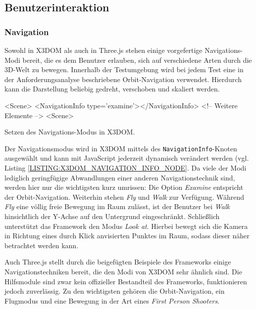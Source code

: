 \subsection{Benutzerinteraktion}

\subsubsection{Navigation}

Sowohl in X3DOM als auch in Three.js stehen einige vorgefertige Navigations-Modi bereit, die es dem Benutzer erlauben, sich auf verschiedene Arten durch die 3D-Welt zu bewegen. Innerhalb der Testumgebung wird bei jedem Test eine in der Anforderungsanalyse beschriebene Orbit-Navigation verwendet. Hierdurch kann die Darstellung beliebig gedreht, verschoben und skaliert werden.

\smallskip
\begin{listing}[!h]
\begin{htmlcode}
<Scene>
	<NavigationInfo type='examine'></NavigationInfo>
	<!-- Weitere Elemente -->
<Scene>
\end{htmlcode}
\caption{Setzen des Navigations-Modus in X3DOM.}
\label{LISTING:X3DOM_NAVIGATION_INFO_NODE}
\end{listing}

Der Navigationsmodus wird in X3DOM mittels des \texttt{NavigationInfo}-Knoten ausgewählt und kann mit JavaScript jederzeit dynamisch verändert werden (vgl. Listing \ref{LISTING:X3DOM_NAVIGATION_INFO_NODE}. Da viele der Modi lediglich geringfügige Abwandlungen einer anderen Navigationstechnik sind, werden hier nur die wichtigsten kurz umrissen: Die Option \emph{Examine} entspricht der Orbit-Navigation. Weiterhin stehen \emph{Fly} und \emph{Walk} zur Verfügung. Während \emph{Fly} eine völlig freie Bewegung im Raum zulässt, ist der Benutzer bei \emph{Walk} hinsichtlich der Y-Achse auf den Untergrund eingeschränkt. Schließlich unterstützt das Framework den Modus \emph{Look at}. Hierbei bewegt sich die Kamera in Richtung eines durch Klick anvisierten Punktes im Raum, sodass dieser näher betrachtet werden kann.

Auch Three.js stellt durch die beigefügten Beispiele des Frameworks einige Navigationstechniken bereit, die den Modi von X3DOM sehr ähnlich sind. Die Hilfsmodule sind zwar kein offizieller Bestandteil des Frameworks, funktionieren jedoch zuverlässig. Zu den wichtigsten gehören die Orbit-Navigation, ein Flugmodus und eine Bewegung in der Art eines \emph{First Person Shooters}.

